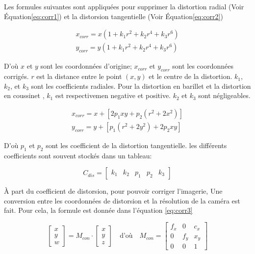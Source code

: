 \documentclass[
]{article}
\begin{document}
Les formules suivantes sont appliquées pour supprimer la distortion radial (Voir Équation\eqref{eq:corr1}) et la distorsion tangentielle (Voir Équation\eqref{eq:corr2})

\begin{equation}
\begin{aligned}
  x_{corr} = x\left(1+k_1r^2+k_2r^4+k_3r^6\right)
  \\y_{corr} = y\left(1+k_1r^2+k_2r^4+k_3r^6\right)
\end{aligned}
 \label{eq:corr1}
\end{equation}

D'où \(𝑥\) et \(𝑦\) sont les coordonnées d'origine; \(x_{𝑐𝑜𝑟𝑟}\) et
\(y_{𝑐𝑜𝑟𝑟}\) sont les coordonnées corrigés. \(𝑟\) est la distance entre le
point \(\left(𝑥, 𝑦\right)\) et le centre de la distortion. \(𝑘_1\), \(𝑘_2\),
et \(𝑘_3\) sont les coefficients radiales. Pour la distortion en barillet et la distortion en coussinet , \(𝑘_1\) est respectivemen negative et positive. \(𝑘_2\) et \(𝑘_3\) sont négligeables.

\begin{equation}
\begin{aligned}
   x_{corr} = x+\left[ 2 p_1 x y+ p_2\left( r^2+2x^2\right) \right]\\
  y_{corr} = y+\left[ p_1 \left(r^2+2 y^2\right)+ 2p_2xy\right]
\end{aligned}
 \label{eq:corr2}
\end{equation}

D'où \(𝑝_1\) et \(𝑝_2\) sont les coefficient de la distortion tangentielle. les différents coefficients sont souvent stockés dans un tableau:

\begin{equation}
C_{dis}=
\begin{bmatrix}
k_1 & k_2 & p_1 & p_2 & k_3
\end{bmatrix}
\end{equation}

À part du coefficient de distorsion, pour pouvoir corriger l'imagerie, Une conversion entre les coordonnées de distorsion et la résolution de la caméra est
fait. Pour cela, la formule est donnée dans l'équation \eqref{eq:corr3}

\begin{equation}
\begin{bmatrix}
x\\
y\\
w
\end{bmatrix}
= M_{con} \cdot
\begin{bmatrix}
x\\
y\\
z
\end{bmatrix}
\quad \text{d'où} \quad
M_{con} =
\begin{bmatrix}
f_x & 0 & c_x\\
0 & f_y & x_y\\
0 & 0 &1
\end{bmatrix}
\label{eq:corr3}
\end{equation}
\end{document}
